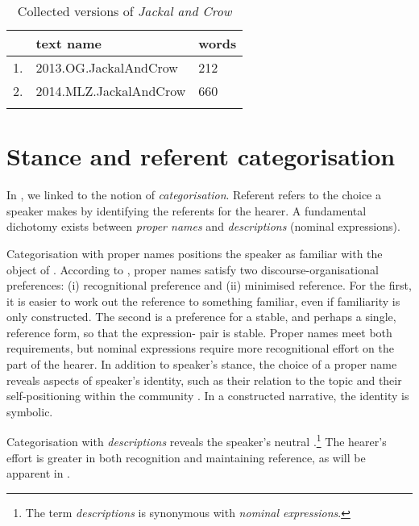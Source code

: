 \documentclass[output=paper
,modfonts
,nonflat]{langsci/langscibook}
\begin{document}
\begin{table}[p]
\caption{Collected versions of \emph{Jackal and Crow} \citep{Carroll2011}}
\label{tab:UsedTextsJackal}
 \begin{tabularx}{.7\textwidth}{Xll} 
  \lsptoprule
& text name & words \\
  \midrule
1. & 2013.OG.JackalAndCrow & 212\\
2. & 2014.MLZ.JackalAndCrow & 660 \\
  \lspbottomrule
 \end{tabularx}
\end{table}



\section{Stance and referent categorisation}\label{StanceAndReference}
In , we linked  to the notion of \emph{ categorisation}. Referent  refers to the choice a speaker makes by identifying the referents for the hearer. A fundamental dichotomy exists between \emph{proper names} and \emph{descriptions} (nominal expressions). 

Categorisation with proper names positions the speaker as familiar with the object of . According to \citet{SacksSchegloff2007}, proper names satisfy two discourse-organisational preferences: (i) recognitional preference and (ii) minimised reference. For the first, it is easier to work out the reference to something familiar, even if familiarity is only constructed. The second is a preference for a stable, and perhaps a single, reference form, so that the expression- pair is stable. Proper names meet both requirements, but nominal expressions require more recognitional effort on the part of the hearer. In addition to speaker's stance, the choice of a proper name reveals  aspects of speaker's identity, such as their relation to the topic and their self-positioning within the community \citep[cf.][13]{Baresova2016}. In a constructed narrative, the identity is symbolic.

Categorisation with  \emph{descriptions} reveals the speaker's neutral .\footnote{The term \emph{descriptions} is synonymous with \emph{nominal expressions}.} The hearer's effort is greater in both recognition and maintaining reference, as will be apparent in .
\end{document}
